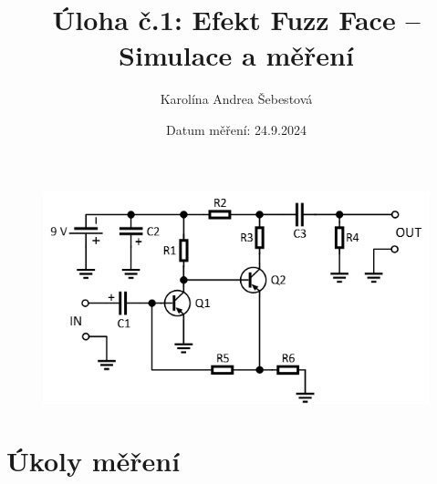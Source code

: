 \documentclass[a4paper, czech]{article}
\title{Úloha č.1: Efekt Fuzz Face – Simulace a měření}
\author{Karolína Andrea Šebestová}
\date{Datum měření: 24.9.2024}
\begin{document}
\maketitle


\begin{figure}[H]
    \centering
    \includegraphics{fuzz_face_schema.png}
\end{figure}

\section{Úkoly měření}
\end{document}
